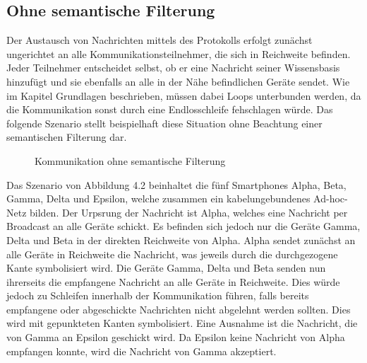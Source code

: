 \subsection{Ohne semantische Filterung}
Der Austausch von Nachrichten mittels des Protokolls erfolgt zunächst ungerichtet an alle Kommunikationsteilnehmer, die sich in Reichweite befinden. Jeder Teilnehmer entscheidet selbst, ob er eine Nachricht seiner Wissensbasis hinzufügt und sie ebenfalls an alle in der Nähe befindlichen Geräte sendet. Wie im Kapitel Grundlagen beschrieben, müssen dabei Loops unterbunden werden, da die Kommunikation sonst durch eine Endlosschleife fehschlagen würde. Das folgende Szenario stellt beispielhaft diese Situation ohne Beachtung einer semantischen  Filterung dar.
\begin{figure}[H]
	\centering
	\hspace*{1cm}
	\caption{Kommunikation ohne semantische Filterung}
	\label{fig:beispielszenario}
\end{figure}
Das Szenario von Abbildung 4.2 beinhaltet die fünf Smartphones Alpha, Beta, Gamma, Delta und Epsilon, welche zusammen ein kabelungebundenes Ad-hoc-Netz bilden. Der Urpsrung der Nachricht ist Alpha, welches eine Nachricht per Broadcast an alle Geräte schickt. Es befinden sich jedoch nur die Geräte Gamma, Delta und Beta in der direkten Reichweite von Alpha. Alpha sendet zunächst an alle Geräte in Reichweite die Nachricht, was jeweils durch die durchgezogene Kante symbolisiert wird. Die Geräte Gamma, Delta und Beta senden nun ihrerseits die empfangene Nachricht an alle Geräte in Reichweite. Dies würde jedoch zu Schleifen innerhalb der Kommunikation führen, falls bereits empfangene oder abgeschickte Nachrichten nicht abgelehnt werden sollten. Dies wird mit gepunkteten Kanten symbolisiert. Eine Ausnahme ist die Nachricht, die von Gamma an Epsilon geschickt wird. Da Epsilon keine Nachricht von Alpha empfangen konnte, wird die Nachricht von Gamma akzeptiert. 

